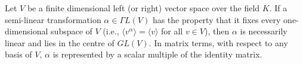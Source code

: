 Let $V$ be a finite dimensional left (or right) vector space over the field $K$. If a semi-linear transformation $\alpha \in \Gamma L(V)$ has the property that it fixes every one-dimensional subspace of $V$ (i.e., $\langle v^\alpha \rangle = \langle v \rangle$ for all $v \in V$), then $\alpha$ is necessarily linear and lies in the centre of $GL(V)$. In matrix terms, with respect to any basis of $V$, $\alpha$ is represented by a scalar multiple of the identity matrix.
